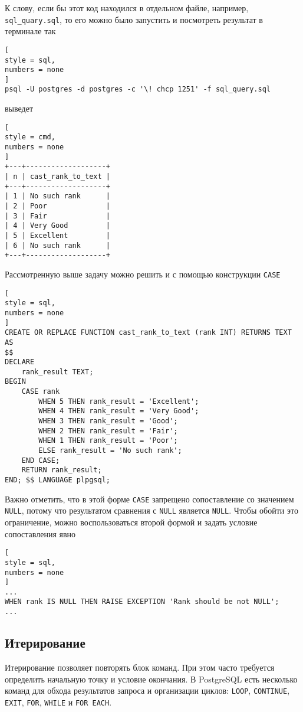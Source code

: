 \documentclass[%
	11pt,
	a4paper,
	utf8,
		]{article}
\begin{document}
К слову, если бы этот код находился в отдельном файле, например, \texttt{sql\_quary.sql}, то его можно было запустить и посмотреть результат в терминале так
\begin{lstlisting}[
style = sql,
numbers = none
]
psql -U postgres -d postgres -c '\! chcp 1251' -f sql_query.sql
\end{lstlisting}
выведет
\begin{lstlisting}[
style = cmd,
numbers = none
]
+---+-------------------+
| n | cast_rank_to_text |
+---+-------------------+
| 1 | No such rank      |
| 2 | Poor              |
| 3 | Fair              |
| 4 | Very Good         |
| 5 | Excellent         |
| 6 | No such rank      |
+---+-------------------+
\end{lstlisting}

Рассмотренную выше задачу можно решить и с помощью конструкции \texttt{CASE}
\begin{lstlisting}[
style = sql,
numbers = none
]
CREATE OR REPLACE FUNCTION cast_rank_to_text (rank INT) RETURNS TEXT AS
$$
DECLARE
    rank_result TEXT;
BEGIN
    CASE rank
        WHEN 5 THEN rank_result = 'Excellent';
        WHEN 4 THEN rank_result = 'Very Good';
        WHEN 3 THEN rank_result = 'Good';
        WHEN 2 THEN rank_result = 'Fair';
        WHEN 1 THEN rank_result = 'Poor';
        ELSE rank_result = 'No such rank';
    END CASE;
    RETURN rank_result;
END; $$ LANGUAGE plpgsql;
\end{lstlisting}

Важно отметить, что в этой форме \texttt{CASE} запрещено сопоставление со значением \texttt{NULL}, потому что результатом сравнения с \texttt{NULL} является \texttt{NULL}. Чтобы обойти это ограничение, можно воспользоваться второй формой и задать условие сопоставления явно
\begin{lstlisting}[
style = sql,
numbers = none
]
...
WHEN rank IS NULL THEN RAISE EXCEPTION 'Rank should be not NULL';
...
\end{lstlisting}

\subsection{Итерирование}

Итерирование позволяет повторять блок команд. При этом часто требуется определить начальную точку и условие окончания. В PostgreSQL есть несколько команд для обхода результатов запроса и организации циклов: \texttt{LOOP}, \texttt{CONTINUE}, \texttt{EXIT}, \texttt{FOR}, \texttt{WHILE} и \texttt{FOR EACH}.
\end{document}
